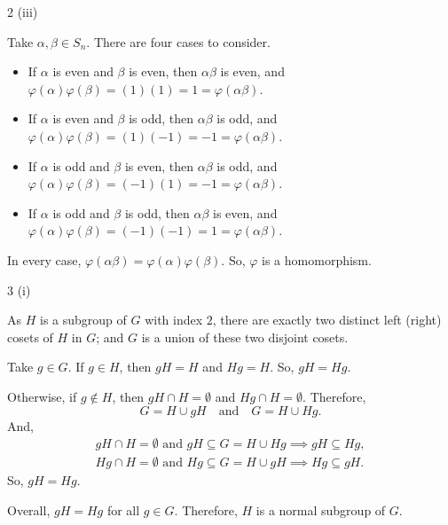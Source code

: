 \documentclass[11pt]{penrose}
\begin{document}
\begin{problem}{2 (iii)}

    Take $\alpha, \beta \in S_n$. There are four cases to consider.
    \begin{itemize}
        \item If $\alpha$ is even and $\beta$ is even, then $\alpha\beta$ is even, and $\varphi(\alpha)\varphi(\beta) = (1)(1) = 1 = \varphi(\alpha\beta)$.
        \item If $\alpha$ is even and $\beta$ is odd, then $\alpha\beta$ is odd, and $\varphi(\alpha)\varphi(\beta) = (1)(-1) = -1 = \varphi(\alpha\beta)$.
        \item If $\alpha$ is odd and $\beta$ is even, then $\alpha\beta$ is odd, and $\varphi(\alpha)\varphi(\beta) = (-1)(1) = -1 = \varphi(\alpha\beta)$.
        \item If $\alpha$ is odd and $\beta$ is odd, then $\alpha\beta$ is even, and $\varphi(\alpha)\varphi(\beta) = (-1)(-1) = 1 = \varphi(\alpha\beta)$.
    \end{itemize}
    In every case, $\varphi(\alpha\beta) = \varphi(\alpha)\varphi(\beta)$. So, $\varphi$ is a homomorphism.
\end{problem}

\begin{problem}{3 (i)}

    As $H$ is a subgroup of $G$ with index $2$, there are exactly two distinct left (right) cosets of $H$ in $G$; and $G$ is a union of these two disjoint cosets.

    Take $g \in G$. If $g \in H$, then $gH = H$ and $Hg = H$. So, $gH = Hg$.

    Otherwise, if $g \notin H$, then $gH \cap H = \emptyset$ and $Hg \cap H = \emptyset$. Therefore,
    \begin{equation*}
        G = H \cup gH \quad\text{and}\quad G = H \cup Hg.
    \end{equation*}
    And,
    \begin{gather*}
        gH \cap H = \emptyset \text{ and } gH \subseteq G = H \cup Hg \implies gH \subseteq Hg,\\
        Hg \cap H = \emptyset \text{ and } Hg \subseteq G = H \cup gH \implies Hg \subseteq gH.
    \end{gather*}
    So, $gH = Hg$.

    Overall, $gH = Hg$ for all $g \in G$. Therefore, $H$ is a normal subgroup of $G$.
\end{problem}
\end{document}
